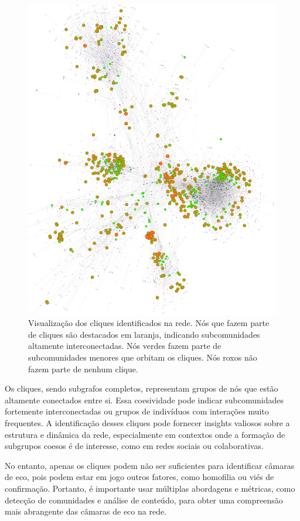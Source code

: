 \begin{figure}[!hbtp]
	\centering
	\includegraphics[scale=0.4]{images/colab-cliques.png}
	\caption{Visualização dos cliques identificados na rede. Nós que fazem parte de cliques são destacados em laranja, indicando subcomunidades altamente interconectadas. Nós verdes fazem parte de subcomunidades menores que orbitam os cliques. Nós roxos não fazem parte de nenhum clique.}
	\label{fig:gephi_cliques}
	\fautor
\end{figure}

Os cliques, sendo subgrafos completos, representam grupos de nós que estão altamente conectados entre si. Essa coesividade pode indicar subcomunidades fortemente interconectadas ou grupos de indivíduos com interações muito frequentes. A identificação desses cliques pode fornecer insights valiosos sobre a estrutura e dinâmica da rede, especialmente em contextos onde a formação de subgrupos coesos é de interesse, como em redes sociais ou colaborativas.

No entanto, apenas os cliques podem não ser suficientes para identificar câmaras de eco, pois podem estar em jogo outros fatores, como homofilia ou viés de confirmação. Portanto, é importante usar múltiplas abordagens e métricas, como detecção de comunidades e análise de conteúdo, para obter uma compreensão mais abrangente das câmaras de eco na rede.


